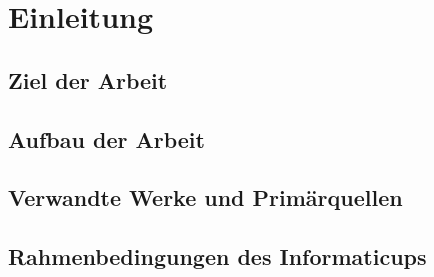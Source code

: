 \chapter{Einleitung}
\label{cha:Einleitung}
\setlength{\epigraphwidth}{4in}

\section{Ziel der Arbeit}
\label{sec:ZielDerArbeit}

\section{Aufbau der Arbeit}

\section{Verwandte Werke und Primärquellen}
\label{sec:VerwandteWerke}

\section{Rahmenbedingungen des Informaticups}
